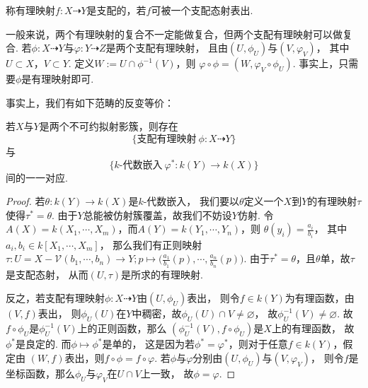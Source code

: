     \begin{definition}[支配有理映射]
        称有理映射$f\colon X \dashrightarrow Y$是支配的，若$f$可被一个支配态射表出.
    \end{definition}

    \begin{remark}
        一般来说，两个有理映射的复合不一定能做复合，但两个支配有理映射可以做复合. 
        若$\phi\colon X \dashrightarrow Y$与$\varphi\colon Y \dashrightarrow Z$是两个支配有理映射，
        且由$(U,\phi_{U})$与$(V,\varphi_{V})$，
        其中$U \subset X$，$V \subset Y$. 定义$W:=U \cap\phi^{-1}(V)$，则
        $\varphi \circ \phi = (W,\varphi_{V} \circ \phi_{U})$.
        事实上，只需要$\phi$是有理映射即可.
    \end{remark}
    
    事实上，我们有如下范畴的反变等价：
    \begin{theorem}
        若$X$与$Y$是两个不可约拟射影簇，则存在
        \[\{支配有理映射\ \phi\colon X \dashrightarrow Y\}\]
        与
        \[\{k\text{-}代数嵌入\ \varphi^{*}\colon k(Y) \rightarrow k(X)\}\]
        间的一一对应.
    \end{theorem}
    \begin{proof}
        若$\theta\colon k(Y) \rightarrow k(X)$是$k$-代数嵌入，
        我们要以$\theta$定义一个$X$到$Y$的有理映射$\tau$使得$\tau^{*}=\theta$. 
        由于$Y$总能被仿射簇覆盖，故我们不妨设$Y$仿射.
        令$A(X)=k(X_{1},\cdots,X_{m})$，而$A(Y)=k(Y_{1},\cdots,Y_{n})$，则
        $\theta(y_{i})=\frac{a_{i}}{b_{i}}$，
        其中$a_{i},b_{i} \in k[X_{1},\cdots,X_{m}]$，
        那么我们有正则映射
        $\tau\colon U=X-\mathcal{V}(b_{1},\cdots,b_{n}) \rightarrow Y;
        p \mapsto \big(\frac{a_{1}}{b_{1}}(p),\cdots,\frac{a_{n}}{b_{n}}(p)\big)$. 
        由于$\tau^{*}=\theta$，且$\theta$单，故$\tau$是支配态射，
        从而$(U,\tau)$是所求的有理映射.

        反之，若支配有理映射$\phi\colon X \dashrightarrow Y$由$(U,\phi_{U})$表出，
        则令$f \in k(Y)$为有理函数，由$(V,f)$表出，
        则$\phi_{U}(U)$在$Y$中稠密，故$\phi_{U}(U) \cap V \neq \varnothing$，
        故$\phi_{U}^{-1}(V) \neq \varnothing$.
        故$f \circ \phi_{U}$是$\phi_{U}^{-1}(V)$上的正则函数，那么
        $(\phi_{U}^{-1}(V),f \circ \phi_{U})$是$X$上的有理函数，
        故$\phi^{*}$是良定的. 而$\phi \mapsto \phi^{*}$是单的，
        这是因为若$\phi^{*}=\varphi^{*}$，则对于任意$f \in k(Y)$，假定由
        $(W,f)$表出，则$f \circ \phi = f \circ \varphi$.
        若$\phi$与$\varphi$分别由$(U,\phi_{U})$与$(V,\varphi_{V})$，
        则令$f$是坐标函数，那么$\phi_{U}$与$\varphi_{V}$在$U \cap V$上一致，
        故$\phi=\varphi$.
    \end{proof}

